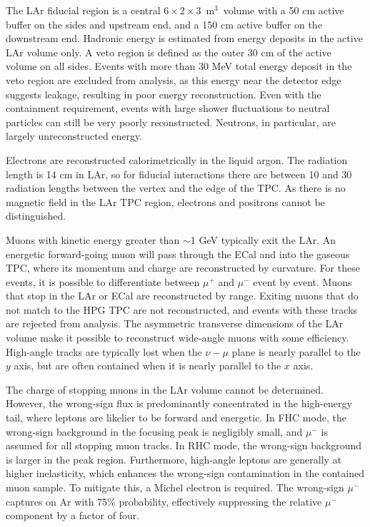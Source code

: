 The LAr fiducial region is a central $6 \times 2 \times 3$~m$^{3}$~volume with a 50 cm active buffer on the sides and upstream end, and a 150 cm active buffer on the downstream end. Hadronic energy is estimated from energy deposits in the active LAr volume only. A veto region is defined as the outer 30 cm of the active volume on all sides. Events with more than 30 MeV total energy deposit in the veto region are excluded from analysis, as this energy near the detector edge suggests leakage, resulting in poor energy reconstruction. Even with the containment requirement, events with large shower fluctuations to neutral particles can still be very poorly reconstructed. Neutrons, in particular, are largely unreconstructed energy.

Electrons are reconstructed calorimetrically in the liquid argon. The radiation length is 14 cm in LAr, so for fiducial interactions there are between 10 and 30 radiation lengths between the vertex and the edge of the TPC. As there is no magnetic field in the LAr TPC region, electrons and positrons cannot be distinguished.

Muons with kinetic energy greater than $\sim$1 GeV typically exit the LAr. An energetic forward-going muon will pass through the ECal and into the gaseous TPC, where its momentum and charge are reconstructed by curvature. For these events, it is possible to differentiate between $\mu^{+}$ and $\mu^{-}$ event by event. Muons that stop in the LAr or ECal are reconstructed by range. Exiting muons that do not match to the HPG TPC are not reconstructed, and events with these tracks are rejected from analysis. The asymmetric transverse dimensions of the LAr volume make it possible to reconstruct wide-angle muons with some efficiency. High-angle tracks are typically lost when the $\nu-\mu$ plane is nearly parallel to the $y$ axis, but are often contained when it is nearly parallel to the $x$ axis. 

The charge of stopping muons in the LAr volume cannot be determined. However, the wrong-sign flux is predominantly concentrated in the high-energy tail, where leptons are likelier to be forward and energetic. In FHC mode, the wrong-sign background in the focusing peak is negligibly small, and $\mu^{-}$ is assumed for all stopping muon tracks. In RHC mode, the wrong-sign background is larger in the peak region. Furthermore, high-angle leptons are generally at higher inelasticity, which enhances the wrong-sign contamination in the contained muon sample. To mitigate this, a Michel electron is required. The wrong-sign $\mu^{-}$ captures on Ar with 75\% probability, effectively suppressing the relative $\mu^{-}$ component by a factor of four.

